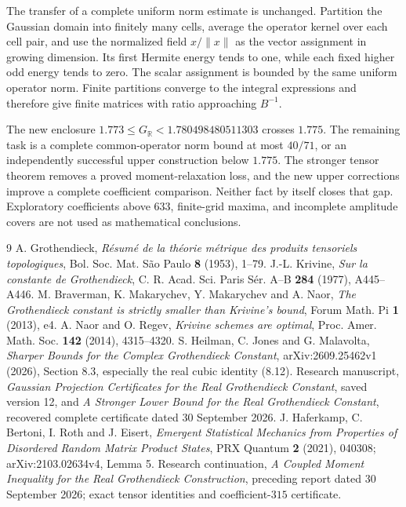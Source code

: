 \documentclass[11pt]{article}
\newcommand{\R}{\mathbb R}
\newcommand{\GR}{G_{\R}}
\newcommand{\norm}[1]{\lVert #1\rVert}
\begin{document}
The transfer of a complete uniform norm estimate is unchanged. Partition the Gaussian domain into finitely many cells, average the operator kernel over each cell pair, and use the normalized field $x/\norm x$ as the vector assignment in growing dimension. Its first Hermite energy tends to one, while each fixed higher odd energy tends to zero. The scalar assignment is bounded by the same uniform operator norm. Finite partitions converge to the integral expressions and therefore give finite matrices with ratio approaching $B^{-1}$.

The new enclosure $1.773\le\GR<1.780498480511303$ crosses $1.775$. The remaining task is a complete common-operator norm bound at most $40/71$, or an independently successful upper construction below $1.775$. The stronger tensor theorem removes a proved moment-relaxation loss, and the new upper corrections improve a complete coefficient comparison. Neither fact by itself closes that gap. Exploratory coefficients above $633$, finite-grid maxima, and incomplete amplitude covers are not used as mathematical conclusions.

\noindent\begin{minipage}{\textwidth}\small
\begin{thebibliography}{9}
 A. Grothendieck, \emph{R\'esum\'e de la th\'eorie m\'etrique des produits tensoriels topologiques}, Bol. Soc. Mat. S\~ao Paulo \textbf{8} (1953), 1--79.
 J.-L. Krivine, \emph{Sur la constante de Grothendieck}, C. R. Acad. Sci. Paris S\'er. A--B \textbf{284} (1977), A445--A446.
 M. Braverman, K. Makarychev, Y. Makarychev and A. Naor, \emph{The Grothendieck constant is strictly smaller than Krivine's bound}, Forum Math. Pi \textbf{1} (2013), e4.
 A. Naor and O. Regev, \emph{Krivine schemes are optimal}, Proc. Amer. Math. Soc. \textbf{142} (2014), 4315--4320.
 S. Heilman, C. Jones and G. Malavolta, \emph{Sharper Bounds for the Complex Grothendieck Constant}, arXiv:2609.25462v1 (2026), Section 8.3, especially the real cubic identity (8.12).
 Research manuscript, \emph{Gaussian Projection Certificates for the Real Grothendieck Constant}, saved version 12, and \emph{A Stronger Lower Bound for the Real Grothendieck Constant}, recovered complete certificate dated 30 September 2026.
 J. Haferkamp, C. Bertoni, I. Roth and J. Eisert, \emph{Emergent Statistical Mechanics from Properties of Disordered Random Matrix Product States}, PRX Quantum \textbf{2} (2021), 040308; arXiv:2103.02634v4, Lemma 5.
 Research continuation, \emph{A Coupled Moment Inequality for the Real Grothendieck Construction}, preceding report dated 30 September 2026; exact tensor identities and coefficient-$315$ certificate.
\end{thebibliography}
\end{minipage}
\end{document}
